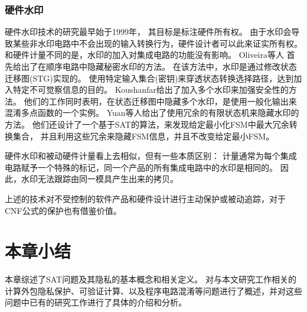 \subsubsection{硬件水印}
硬件水印技术的研究最早始于1999年，
其目标是标注硬件所有权。
由于水印会导致某些非水印电路中不会出现的输入转换行为，硬件设计者可以此来证实所有权。
和硬件计量不同的是，水印的加入对集成电路的功能没有影响。
Oliveira等人
首先给出了在顺序电路中隐藏秘密水印的方法。
在该方法中，水印是通过修改状态迁移图(STG)实现的。
使用特定输入集合(密钥)来穿透状态转换选择路径，达到加入特定不可觉察信息的目的。
Koushanfar给出了加入多个水印来加强安全性的方法。
他们的工作同时表明，在状态迁移图中隐藏多个水印，是使用一般化输出来混淆多点函数的一个实例。
Yuan等人给出了使用冗余的有限状态机来隐藏水印的方法。
他们还设计了一个基于SAT的算法，来发现给定最小化FSM中最大冗余转换集合，
并且利用这些冗余来隐藏FSM信息，并且不改变给定最小FSM。

硬件水印和被动硬件计量看上去相似，但有一些本质区别：
计量通常为每个集成电路赋予一个特殊的标记，同一个产品的所有集成电路中的水印是相同的。
因此，水印无法跟踪由同一模具产生出来的拷贝。

上述的技术对不受控制的软件产品和硬件设计进行主动保护或被动追踪，对于CNF公式的保护也有借鉴价值。

\section{本章小结}
本章综述了SAT问题及其隐私的基本概念和相关定义。
对与本文研究工作相关的计算外包隐私保护、可验证计算、以及程序电路混淆等问题进行了概述，并对这些问题中已有的研究工作进行了具体的介绍和分析。
